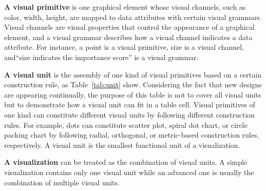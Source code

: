 \textbf{A visual primitive} is one graphical element whose visual channels, such as color, width, height, are mapped to data attributes with certain visual grammars. Visual channels are visual properties that control the appearance of a graphical element, and a visual grammar describes how a visual channel indicates a data attribute. For instance, a point is a visual primitive, size is a visual channel, and``size indicates the importance score'' is a visual grammar. 

\textbf{A visual unit} is the assembly of one kind of visual primitives based on a certain construction rule, as Table~\ref{tab:unit} show. Considering the fact that new designs are appearing continually, the purpose of this table is not to cover all visual units but to demonstrate how a visual unit can fit in a table cell.
Visual primitives of one kind can constitute different visual units by following different construction rules. For example, dots can constitute scatter plot, spiral dot chart, or circle packing chart by following radial, orthogonal, or metric-based construction rules, respectively. 
A visual unit is the smallest functional unit of a visualization. 

\textbf{A visualization} can be treated as the combination of visual units. A simple visualization contains only one visual unit while an advanced one is usually the combination of multiple visual units. 




